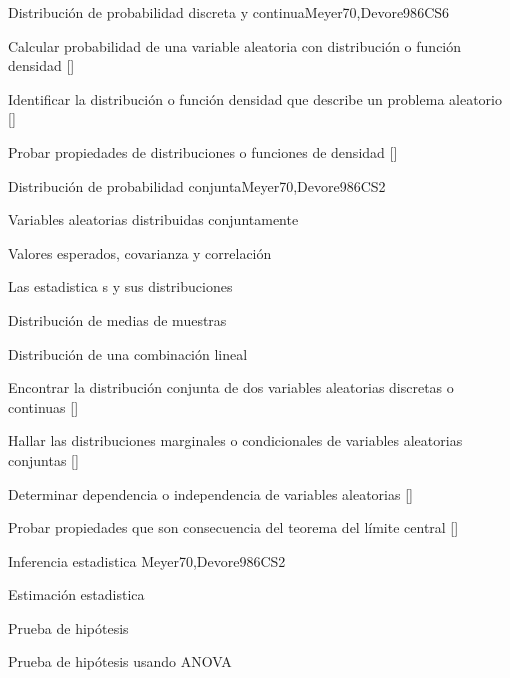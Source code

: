\begin{syllabus}
\begin{unit}{}{Distribución de probabilidad discreta y continua}{Meyer70,Devore98}{6}{CS6}
   \begin{learningoutcomes}
      \item Calcular probabilidad de una variable aleatoria con distribución o función densidad [\Usage]
      \item Identificar la distribución o función densidad que describe un problema aleatorio [\Usage]
      \item Probar propiedades de distribuciones o funciones de densidad [\Usage]
   \end{learningoutcomes}
\end{unit}

\begin{unit}{}{Distribución de probabilidad conjunta}{Meyer70,Devore98}{6}{CS2}
\begin{topics}
      \item Variables aleatorias distribuidas conjuntamente 
      \item Valores esperados, covarianza y correlación
      \item Las estadistica s y sus distribuciones
      \item Distribución de medias de muestras
      \item Distribución de una combinación lineal

   \end{topics}
   \begin{learningoutcomes}
      \item Encontrar la distribución conjunta de dos variables aleatorias discretas o continuas [\Usage]
      \item Hallar las distribuciones marginales o condicionales de variables aleatorias conjuntas [\Usage]
      \item Determinar dependencia o independencia de variables aleatorias [\Usage]
      \item Probar propiedades que son consecuencia del teorema  del límite central [\Usage]
   \end{learningoutcomes}
\end{unit}

\begin{unit}{}{Inferencia estadistica }{Meyer70,Devore98}{6}{CS2}
\begin{topics}
      \item Estimación estadistica 
      \item Prueba de hipótesis
      \item Prueba de hipótesis usando ANOVA
   \end{topics}


\end{unit}
\end{syllabus}
